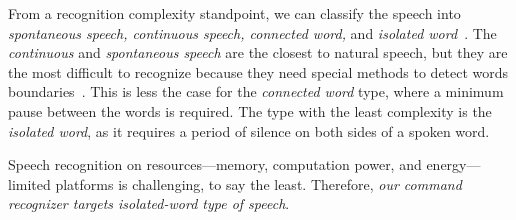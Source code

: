 From a recognition complexity standpoint, we can classify the speech into \textit{spontaneous speech, continuous speech, connected word,} and \textit{isolated word}~\cite{gaikwad2010review}.
The \textit{continuous} and \textit{spontaneous speech} are the closest to natural speech, but they are the most difficult to recognize because they need special methods to detect words boundaries~\cite{gaikwad2010review}. This is less the case for the \textit{connected word} type, where a minimum pause between the words is required. The type with the least complexity is the \textit{isolated word}, as it requires a period of silence on both sides of a spoken word. 

Speech recognition on resources---memory, computation power, and energy---limited platforms is challenging, to say the least. Therefore, \emph{our command recognizer targets isolated-word type of speech}. 



















